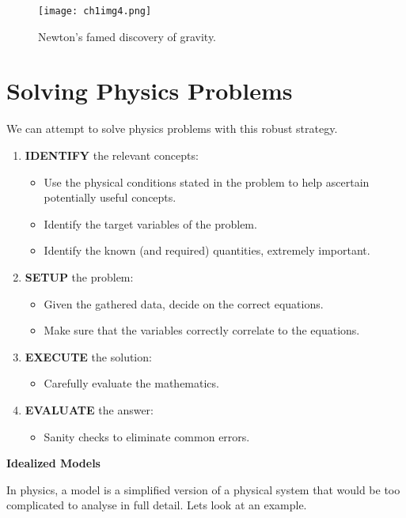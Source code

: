 \begin{figure}[htbp]
  \centering
  \texttt{[image: ch1img4.png]}
  \caption{Newton's famed discovery of gravity.}
  \label{fig:ch1img4}
\end{figure}
\section{Solving Physics Problems}
We can attempt to solve physics problems with this robust strategy.

\begin{enumerate}
	\item \textbf{IDENTIFY} the relevant concepts:
	\begin{itemize}
		\item Use the physical conditions stated in the problem to help ascertain potentially useful concepts.
		\item Identify the target variables of the problem.
		\item Identify the known (and required) quantities, extremely important.
	\end{itemize}
	
	\item \textbf{SETUP} the problem:
	\begin{itemize}
		\item Given the gathered data, decide on the correct equations.
		\item Make sure that the variables correctly correlate to the equations.
	\end{itemize}

	\item \textbf{EXECUTE} the solution:
	\begin{itemize}
		\item Carefully evaluate the mathematics.
	\end{itemize}

	\item \textbf{EVALUATE} the answer:
	\begin{itemize}
		\item Sanity checks to eliminate common errors.
	\end{itemize}
\end{enumerate}

\bigskip

\textbf{Idealized Models}

In physics, a model is a simplified version of a physical system that would be too complicated to analyse in full detail. Lets look at an example.

